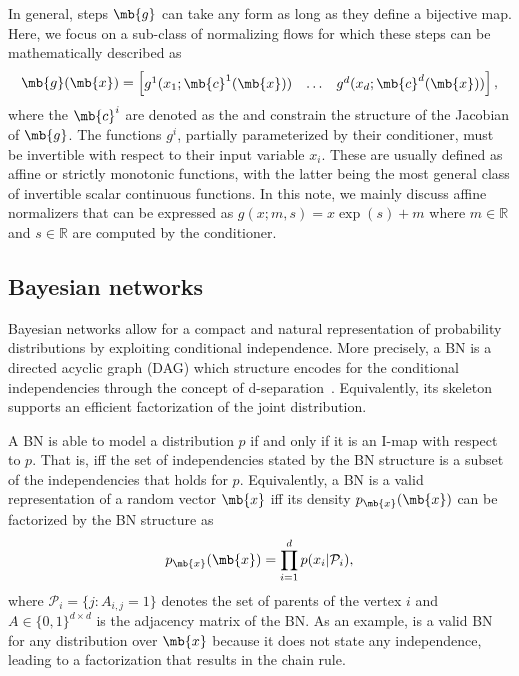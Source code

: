 In general, steps $\mb{g}$ can take any form as long as they define a bijective map. Here, we focus on a sub-class of normalizing flows for which these steps can be mathematically described as
\begin{equation*}
    \mb{g}(\mb{x}) = \begin{bmatrix}
g^1(x_{1}; \mb{c}^1(\mb{x})) & \hdots & g^d(x_{d}; \mb{c}^d(\mb{x}))
\end{bmatrix},\label{eq:gnf}
\end{equation*}
where the $\mb{c}^i$ are denoted as the  and constrain the structure of the Jacobian of $\mb{g}$. The functions $g^i$, partially parameterized by their conditioner, must be invertible with respect to their input variable $x_i$. These are usually defined as affine or strictly monotonic functions, with the latter being the most general class of invertible scalar continuous functions.
In this note, we mainly discuss affine normalizers that can be expressed as
$g(x;m, s) = x\exp(s) + m$
where $m \in \mathbb{R}$ and $s \in \mathbb{R}$ are computed by the conditioner.



\subsection{Bayesian networks}

Bayesian networks allow for a compact and natural representation of probability distributions by exploiting conditional independence. More precisely, a BN is a directed acyclic graph (DAG) which structure encodes for the conditional independencies through the concept of d-separation~\citep{d-separation}. Equivalently, its skeleton supports an efficient factorization of the joint distribution.

A BN is able to model a distribution $p$ if and only if it is an I-map with respect to $p$. That is, iff the set of independencies stated by the BN structure is a subset of the independencies that holds for $p$. Equivalently, a BN is a valid representation of a random vector $\mb{x}$ iff its density $p_{\mb{x}}(\mb{x})$ can be factorized by the BN structure as
\begin{equation}
    p_{\mb{x}}(\mb{x}) = \prod^d_{i=1}p(x_i|\mathcal{P}_i),\label{eq:BN-fact}
\end{equation}
where  $\mathcal{P}_i = \{j: A_{i,j} = 1 \}$ denotes the set of parents of the vertex $i$ and $A \in \{0, 1\}^{d\times d}$ is the adjacency matrix of the BN. As an example,  is a valid BN for any distribution over $\mb{x}$ because it does not state any independence, leading to a factorization that results in the chain rule.


